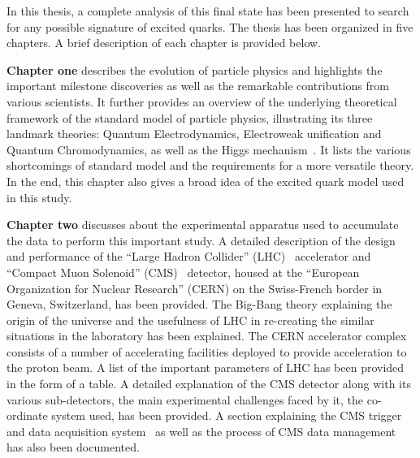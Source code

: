 \documentclass[12pt,a4]{article}
\begin{document}
In this thesis, a complete analysis of this final state has been presented to search for any possible signature of excited quarks.
The thesis has been organized in five chapters. A brief description of each chapter is provided below. 

\textbf{Chapter one} describes the evolution of particle physics and highlights the important milestone discoveries as well as
the remarkable contributions from various scientists. It further provides an overview of the underlying theoretical framework of the standard model of particle physics,
illustrating its three landmark theories: Quantum Electrodynamics, Electroweak unification
and Quantum Chromodynamics, as well as the Higgs mechanism~\cite{Higgs:1964ia, Englert:1964et, Higgs:1964pj, Guralnik:1964eu, Higgs:1966ev}.
It lists the various shortcomings of standard model and the requirements for a more versatile theory. In the end, this chapter also gives a
broad idea of the excited quark model used in this study.

\textbf{Chapter two} discusses about the experimental apparatus used to accumulate the data to perform this important study. A detailed description of
the design and performance of the ``Large Hadron Collider'' (LHC)~\cite{Bruning:782076, Evans:2008zzb} accelerator
and ``Compact Muon Solenoid'' (CMS)~\cite{cmsTDR} detector, housed at the
``European Organization for Nuclear Research'' (CERN) on the Swiss-French border in Geneva, Switzerland, has been provided. The Big-Bang theory explaining the origin
of the universe and the usefulness of LHC in re-creating the similar situations in the laboratory has been explained. The CERN accelerator complex~\cite{Web:CERN}
consists of a number of
accelerating facilities deployed to provide acceleration to the proton beam. A list of the important parameters of LHC has been provided in the form of a table.
A detailed explanation of the CMS detector along with its various sub-detectors, the main experimental challenges faced by it, the co-ordinate system used,
\etc has been provided. A section explaining the CMS trigger and data acquisition system~\cite{triggerTDR, daqhltTDR}
as well as the process of CMS data management has also been documented. 
\end{document}
